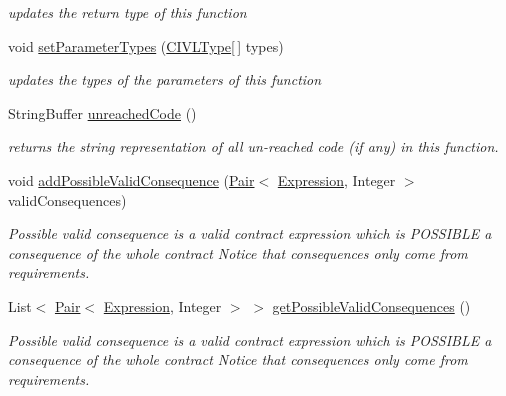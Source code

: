 \begin{DoxyCompactItemize}
\begin{DoxyCompactList}\small\item\em updates the return type of this function \end{DoxyCompactList}\item 
void \hyperlink{interfaceedu_1_1udel_1_1cis_1_1vsl_1_1civl_1_1model_1_1IF_1_1CIVLFunction_a6450eb0c4d4b929b788d846581692443}{set\+Parameter\+Types} (\hyperlink{interfaceedu_1_1udel_1_1cis_1_1vsl_1_1civl_1_1model_1_1IF_1_1type_1_1CIVLType}{C\+I\+V\+L\+Type}\mbox{[}$\,$\mbox{]} types)
\begin{DoxyCompactList}\small\item\em updates the types of the parameters of this function \end{DoxyCompactList}\item 
String\+Buffer \hyperlink{interfaceedu_1_1udel_1_1cis_1_1vsl_1_1civl_1_1model_1_1IF_1_1CIVLFunction_a1191cad8ae59878b1b7fad93db85f60b}{unreached\+Code} ()
\begin{DoxyCompactList}\small\item\em returns the string representation of all un-\/reached code (if any) in this function. \end{DoxyCompactList}\item 
void \hyperlink{interfaceedu_1_1udel_1_1cis_1_1vsl_1_1civl_1_1model_1_1IF_1_1CIVLFunction_a8fecf22a1ac96e8d066f758cb4f2568a}{add\+Possible\+Valid\+Consequence} (\hyperlink{classedu_1_1udel_1_1cis_1_1vsl_1_1civl_1_1util_1_1IF_1_1Pair}{Pair}$<$ \hyperlink{interfaceedu_1_1udel_1_1cis_1_1vsl_1_1civl_1_1model_1_1IF_1_1expression_1_1Expression}{Expression}, Integer $>$ valid\+Consequences)
\begin{DoxyCompactList}\small\item\em Possible valid consequence is a valid contract expression which is P\+O\+S\+S\+I\+B\+L\+E a consequence of the whole contract Notice that consequences only come from requirements. \end{DoxyCompactList}\item 
List$<$ \hyperlink{classedu_1_1udel_1_1cis_1_1vsl_1_1civl_1_1util_1_1IF_1_1Pair}{Pair}$<$ \hyperlink{interfaceedu_1_1udel_1_1cis_1_1vsl_1_1civl_1_1model_1_1IF_1_1expression_1_1Expression}{Expression}, Integer $>$ $>$ \hyperlink{interfaceedu_1_1udel_1_1cis_1_1vsl_1_1civl_1_1model_1_1IF_1_1CIVLFunction_a08bc200148f4bcc480db8da4bcad446a}{get\+Possible\+Valid\+Consequences} ()
\begin{DoxyCompactList}\small\item\em Possible valid consequence is a valid contract expression which is P\+O\+S\+S\+I\+B\+L\+E a consequence of the whole contract Notice that consequences only come from requirements. \end{DoxyCompactList}\item 

\end{DoxyCompactItemize}
